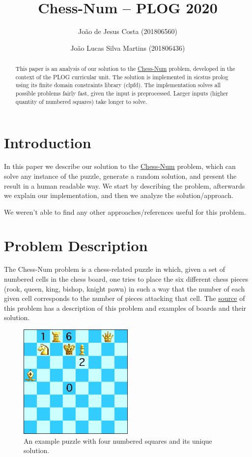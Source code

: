 \documentclass[runningheads]{llncs}
\title{Chess-Num -- PLOG 2020}
\author{João de Jesus Costa (201806560) \and João Lucas Silva Martins (201806436)}
\institute{FEUP, UPorto}
\begin{document}
\maketitle

\begin{abstract}
This paper is an analysis of our solution to the  \href{https://erich-friedman.github.io/puzzle/chessnum/}{Chess-Num}
problem, developed in the context of the PLOG curricular unit. The solution is
implemented in sicstus prolog using its finite domain constraints library (clpfd).
The implementation solves all possible problems fairly fast, given the input
is preprocessed. Larger inputs (higher quantity of numbered squares) take longer
to solve.

\end{abstract}

\section{Introduction}

In this paper we describe our solution to the \href{https://erich-friedman.github.io/puzzle/chessnum/}{Chess-Num}
problem, which can solve any instance of the puzzle, generate a random solution, and
present the result in a human readable way.
We start by describing the problem, afterwards we explain our implementation, and 
then we analyze the solution/approach.

We weren't able to find any other approaches/references useful for this problem.

\section{Problem Description}

The Chess-Num problem is a chess-related puzzle in which, given a set of
numbered cells in the chess board, one tries to place the six different chess
pieces (rook, queen, king, bishop, knight pawn) in such a way that the number
of each given cell corresponds to the number of pieces attacking that cell.
The \href{https://erich-friedman.github.io/puzzle/chessnum/}{source} of this
problem has a description of this problem and examples of boards and their solution.
\begin{figure}[H]
  \centering
  \includegraphics[width=0.5\textwidth]{figures/chessdemo.eps}
  \caption{An example puzzle with four numbered squares and its unique solution.}\label{fig:fig1}
\end{figure}
\end{document}
